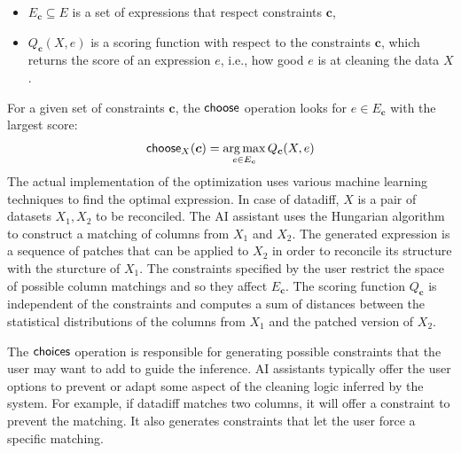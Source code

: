 \documentclass[ a4paper,UKenglish,cleveref, autoref, thm-restate]{lipics-v2021}
\newcommand{\ident}[1]{\textsf{#1}}
\newcommand{\select}{\textnormal{\ident{choose}}}
\newcommand{\choices}{\textnormal{\ident{choices}}}
\DeclareMathOperator{\argmax}{arg\,max}
\begin{document}
\vspace{-0.25em}
\begin{itemize}
\item $E_{\boldsymbol{c}}\subseteq E$ is a set of expressions that respect constraints $\boldsymbol{c}$,
\item $Q_{\boldsymbol{c}}(X, e)$ is a scoring function with respect to the constraints $\boldsymbol{c}$,
  which returns the score of an expression $e$, i.e., how good $e$ is at cleaning the data $X$.
\end{itemize}
\vspace{-0.25em}

\noindent
For a given set of constraints $\boldsymbol{c}$, the $\select$ operation looks
for $e\in E_{\boldsymbol{c}}$ with the largest score:
\[
\select_X(\boldsymbol{c}) = \argmax_{e \in E_{\boldsymbol{c}}} Q_{\boldsymbol{c}}(X, e)
\]
The actual implementation of the optimization uses various machine learning techniques to
find the optimal expression. In case of datadiff, $X$ is a pair of datasets $X_1, X_2$ to be
reconciled. The AI assistant uses the Hungarian algorithm \cite{sutton-2018-datadiff} to construct
a matching of columns from $X_1$ and $X_2$. The generated expression is a sequence of patches
that can be applied to $X_2$ in order to reconcile its structure with the sturcture of $X_1$.
The constraints specified by the user restrict the space of possible column matchings and so they
affect $E_{\boldsymbol{c}}$. The scoring function $Q_{\boldsymbol{c}}$ is independent of
the constraints and computes a sum of distances between the statistical distributions of the
columns from $X_1$ and the patched version of $X_2$.

The $\choices$ operation is responsible for generating possible constraints that the user may
want to add to guide the inference. AI assistants typically offer the user options to prevent
or adapt some aspect of the cleaning logic inferred by the system. For example, if datadiff
matches two columns, it will offer a constraint to prevent the matching. It also generates
constraints that let the user force a specific matching.
\end{document}
